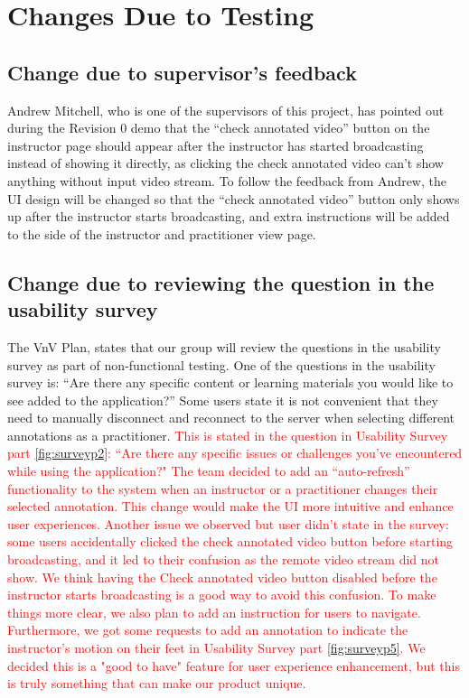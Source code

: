 \documentclass[12pt, titlepage]{article}
\newcommand{\rt}[1]{\textcolor{red}{#1}}
\begin{document}
\section{Changes Due to Testing}

\subsection{Change due to supervisor's feedback}

Andrew Mitchell, who is one of the supervisors of this project, has pointed out
during the Revision 0 demo that the “check annotated video” button on the
instructor page should appear after the instructor has started broadcasting
instead of showing it directly, as clicking the check annotated video can’t show
anything without input video stream. To follow the feedback from Andrew, the UI
design will be changed so that the “check annotated video” button only shows up
after the instructor starts broadcasting, and extra instructions will be added
to the side of the instructor and practitioner view page.

\subsection{Change due to reviewing the question in the usability survey}

The VnV Plan, states that our group will review the questions in the usability
survey as part of non-functional testing. One of the questions in the usability
survey is: “Are there any specific content or learning materials you would like
to see added to the application?” Some users state it is not convenient that
they need to manually disconnect and reconnect to the server when selecting
different annotations as a practitioner. \rt{This is stated in the question in Usability 
Survey part \ref{fig:surveyp2}: ``Are there any specific issues or challenges you've 
encountered while using the application?" The team decided to add an “auto-refresh” 
functionality to the system when an instructor or a practitioner changes their 
selected annotation. This change would make the UI more intuitive and enhance
user experiences. Another issue we observed but user didn't state in the survey: some 
users accidentally clicked the check annotated video button before starting broadcasting, 
and it led to their confusion as the remote video stream did not show. We think having 
the Check annotated video button disabled before the instructor starts broadcasting is 
a good way to avoid this confusion. To make things more clear, we also plan to add an 
instruction for users to navigate. Furthermore, we got some requests to add an annotation 
to indicate the instructor's motion on their feet in Usability Survey part \ref{fig:surveyp5}. 
We decided this is a "good to have" feature for user experience enhancement, but this 
is truly something that can make our product unique. }
\end{document}
